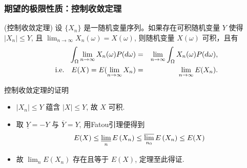 	\begin{frame}
		\frametitle{期望的极限性质：控制收敛定理}
		\begin{thm}
			(控制收敛定理) 设 $\{X_n\}$ 是一随机变量序列。如果存在可积随机变量 $Y$ 使得 $|X_n|\leq Y$, 且 $\lim_{n\rightarrow\infty} X_n (\omega)=X (\omega)$, 则随机变量 $X (\omega)$ 可积，且有
			\begin{eqnarray*}
				\int_{\Omega}\lim_{n\rightarrow\infty}X_n(\omega)P(d\omega)&=& \lim_{n\rightarrow\infty}\int_\Omega X_n(\omega)P(d\omega),\\
				\quad{\rm i.e.} \quad    E(X)=E(\lim_{n\rightarrow\infty}X_n)&=&\lim_{n\rightarrow\infty}E(X_n).
			\end{eqnarray*}

		\end{thm}

	\end{frame}
	\begin{frame}{控制收敛定理的证明}
		\begin{itemize}[<+-|alert@+>]
			\item  $\left|X_{n}\right| \leq Y$ 蕴含 $|X| \leq Y$, 故 $X$ 可积.
			\item 取 $\underline{Y}=-Y$ 与 $\overline{Y}=Y$, 用Fatou引理便得到
			\[
			E(X) \leq \varliminf_{n} E\left(X_{n}\right) \leq \varlimsup_{n_{0}} E\left(X_{n}\right) \leq E(X)
			\]
			\item 故 $\lim _{n} E\left(X_{n}\right)$ 存在且等于 $E(X)$, 定理至此得证.
		\end{itemize}


	\end{frame}

